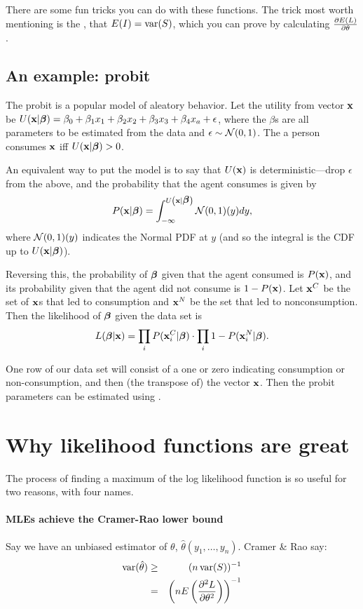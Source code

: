 There are some fun tricks you can do with these functions.
The trick most worth mentioning is the
, that $E(I)=\operatorname{var}(S)$, which you can prove by
calculating ${\partial E(L)\over \partial \theta}$.

\subsection{An example: probit} 
The probit is a popular model of aleatory behavior. 
Let the utility from vector ${\bf x}$ be 
$U({\bf x}|{\mbox{\boldmath$\beta$}}) = \beta_0 + \beta_1 x_1 + \beta_2 x_2 + \beta_3 x_3 + \beta_4 x_a + \epsilon$,
where the $\beta$s are all parameters to be estimated from
the data and $\epsilon \sim {\cal N}(0,1)$.
The a person consumes ${\bf x}$ iff $U({\bf x}|{\mbox{\boldmath$\beta$}})>0$. 

An equivalent way to put the model is to say that $U({\bf x})$ is
deterministic---drop $\epsilon$ from the above, and the probability that
the agent consumes is given by
$$P({\bf x}|{\mbox{\boldmath$\beta$}}) = \int_{-\infty}^{U\left({\bf x}|{\mbox{\boldmath$\beta$}}\right)} {\cal N}(0,1)(y) dy,$$
where ${\cal N}(0,1)(y)$ indicates the Normal PDF at $y$ (and so the
integral is the CDF up to $U({\bf x}|{\mbox{\boldmath$\beta$}})$).

Reversing this, the probability of ${\mbox{\boldmath$\beta$}}$ given that the agent
consumed is $P({\bf x})$, and its probability given that the agent did not
consume is $1-P({\bf x})$. Let ${\bf x}^C$ be the set of ${\bf x}$s that led to
consumption and ${\bf x}^N$ be the set that led to nonconsumption. Then the
likelihood of ${\mbox{\boldmath$\beta$}}$ given the data set is 
$$L({\mbox{\boldmath$\beta$}}|{\bf x}) = \prod_{i} P({\bf x}^C_i|{\mbox{\boldmath$\beta$}}) \cdot \prod_{i} 1-P({\bf x}^N_i|{\mbox{\boldmath$\beta$}}).$$ 

One row of our data set will consist of a one or zero indicating
consumption or non-consumption, and then (the transpose of) the vector
${\bf x}$. Then the probit parameters can be estimated using
.

\section{Why likelihood functions are great} The process of finding a
maximum of the log likelihood function is 
so useful for two reasons, with four names.

\paragraph{MLEs achieve the Cramer-Rao lower bound} 
        		\label{cr} 
Say we have an unbiased estimator of $\theta$,
$\hat\theta(y_1,\dots,y_n)$. Cramer \& Rao say:
\begin{eqnarray}
\operatorname{var}(\hat\theta)&\geq&(n \operatorname{var}(S))^{-1}		\nonumber\\
		&=&\left(nE\left({\partial^2 L\over \partial
\theta^2}\right)\right)^{-1}			\label{CRLB}
\end{eqnarray}

